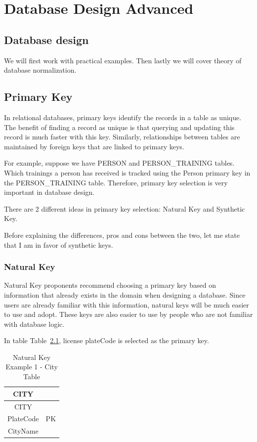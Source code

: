 \documentclass[
  letterpaper,
  DIV=11,
  numbers=noendperiod]{scrreprt}
\begin{document}
\part{Database Design Advanced}

\chapter{Database design}\label{database-design}

We will first work with practical examples. Then lastly we will cover
theory of database normalization.

\chapter{Primary Key}\label{primary-key}

In relational databases, primary keys identify the records in a table as
unique. The benefit of finding a record as unique is that querying and
updating this record is much faster with this key. Similarly,
relationships between tables are maintained by foreign keys that are
linked to primary keys.

For example, suppose we have PERSON and PERSON\_TRAINING tables. Which
trainings a person has received is tracked using the Person primary key
in the PERSON\_TRAINING table. Therefore, primary key selection is very
important in database design.

There are 2 different ideas in primary key selection: Natural Key and
Synthetic Key.

Before explaining the differences, pros and cons between the two, let me
state that I am in favor of synthetic keys.

\section{Natural Key}\label{natural-key}

Natural Key proponents recommend choosing a primary key based on
information that already exists in the domain when designing a database.
Since users are already familiar with this information, natural keys
will be much easier to use and adopt. These keys are also easier to use
by people who are not familiar with database logic.

In table
Table~\ref{tbl-table-primary-key-natural-key-example-city-table},
license plateCode is selected as the primary key.

\begin{longtable}[]{@{}cc@{}}
\caption{Natural Key Example 1 - City
Table}\label{tbl-table-primary-key-natural-key-example-city-table}\tabularnewline
\toprule\noalign{}
CITY & \\
\midrule\noalign{}
\endfirsthead
\toprule\noalign{}
CITY & \\
\midrule\noalign{}
\endhead
\bottomrule\noalign{}
\endlastfoot
PlateCode & PK \\
CityName & \\
\end{longtable}
\end{document}
